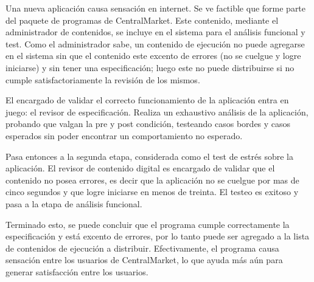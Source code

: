 \documentclass[11pt, a4paper, spanish]{article}
\begin{document}
	Una nueva aplicaci\'on causa sensaci\'on en internet. Se ve factible que forme parte del paquete de programas de CentralMarket. Este contenido, 
   mediante el administrador de contenidos, se incluye en el sistema para el an\'alisis funcional y test. Como el administrador sabe, un contenido de 
   ejecuci\'on no puede agregarse en el sistema sin que el contenido este excento de errores (no se cuelgue y logre iniciarse) y sin tener una 
   especificaci\'on; luego este no puede distribuirse si no cumple satisfactoriamente la revisi\'on de los mismos.

	El encargado de validar el correcto funcionamiento de la aplicaci\'on entra en juego: el revisor de especificaci\'on. Realiza un exhaustivo 
   an\'alisis de la aplicaci\'on, probando que valgan la pre y post condici\'on, testeando casos bordes y casos esperados sin poder encontrar un 
   comportamiento no esperado.

	Pasa entonces a la segunda etapa, considerada como el test de estr\'es sobre la aplicaci\'on. El revisor de contenido digital es encargado de 
   validar que el contenido no posea errores, es decir que la aplicaci\'on no se cuelgue por mas de cinco segundos y que logre iniciarse en menos de 
   treinta. El testeo es exitoso y pasa a la etapa de an\'alisis funcional.

	Terminado esto, se puede concluir que el programa cumple correctamente la especificaci\'on y est\'a excento de errores, por lo tanto puede ser 
   agregado a la lista de contenidos de ejecuci\'on a distribuir.
        Efectivamente, el programa causa sensaci\'on entre los usuarios de CentralMarket, lo que ayuda m\'as a\'un para generar satisfacci\'on entre los 
   usuarios.
\end{document}
